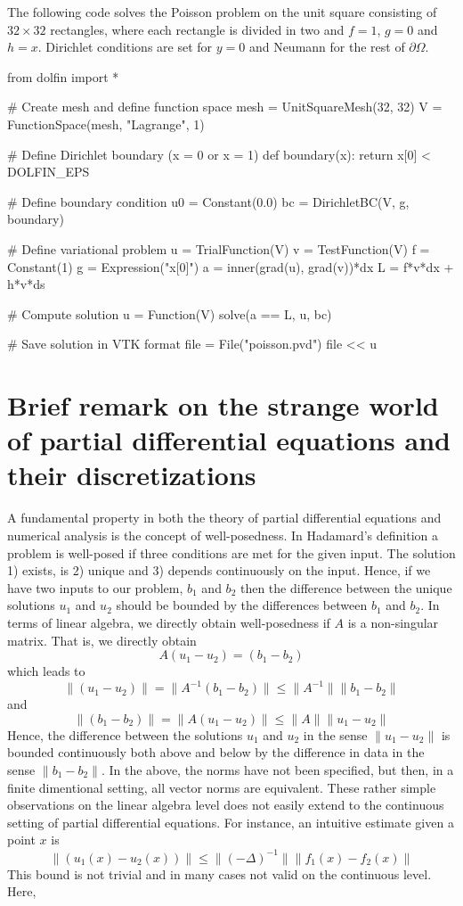 The following code solves the Poisson problem on the unit square
consisting of $32\times 32$ rectangles, where each rectangle is divided
in two and $f=1$, $g=0$ and $h=x$. Dirichlet conditions are set 
for $y=0$ and Neumann for the rest of $\partial \Omega$.  

\begin{python}
from dolfin import *

# Create mesh and define function space
mesh = UnitSquareMesh(32, 32)
V = FunctionSpace(mesh, "Lagrange", 1)

# Define Dirichlet boundary (x = 0 or x = 1)
def boundary(x): return x[0] < DOLFIN_EPS 

# Define boundary condition
u0 = Constant(0.0)
bc = DirichletBC(V, g, boundary)

# Define variational problem
u = TrialFunction(V)
v = TestFunction(V)
f = Constant(1)
g = Expression("x[0]")
a = inner(grad(u), grad(v))*dx
L = f*v*dx + h*v*ds

# Compute solution
u = Function(V)
solve(a == L, u, bc)

# Save solution in VTK format
file = File("poisson.pvd")
file << u
\end{python}

\section{Brief remark on the strange world of partial differential equations and their discretizations }

A fundamental property in both the theory of partial differential equations and numerical analysis is the
concept of well-posedness. In Hadamard's definition a problem is well-posed if three conditions are met for the given input.  
The solution 1) exists, is 2) unique
and 3) depends continuously on the input. Hence, if we have two inputs to our problem, $b_1$ and $b_2$ 
then the difference between the unique solutions $u_1$ and $u_2$ should be bounded by the differences
between $b_1$ and $b_2$. In terms of linear algebra, we directly obtain well-posedness if
$A$ is a non-singular matrix. That is, we directly obtain 
\[
A(u_1 - u_2)  = (b_1 - b_2)     
\]
which leads to 
\[
	\|(u_1 - u_2) \| = \|A^{-1}(b_1 - b_2)\| \le  \|A^{-1}\| \|b_1 - b_2\|     
\]
and 
\[
	\|(b_1 - b_2) \| = \|A (u_1 - u_2)\|  \le  \|A\| \|u_1 - u_2\|     
\]
Hence, the difference between the solutions $u_1$ and $u_2$ in the sense 
$\|u_1 - u_2\|$ is bounded continuously both above and below by the difference in data in the sense $\|b_1 - b_2\|$.    
In the above, the norms have not been specified, but then, in a finite dimentional setting, all vector norms are equivalent.   
These rather simple observations on the linear algebra level does not easily extend to the continuous setting of partial differential equations. 
For instance, an intuitive estimate given a point $x$ is  
\[
	\|(u_1(x) - u_2(x)) \| \le \|(-\Delta)^{-1} \| \|f_1(x) - f_2(x)\|     
\]
This bound is not trivial and in many cases not valid on the continuous level. Here, 

